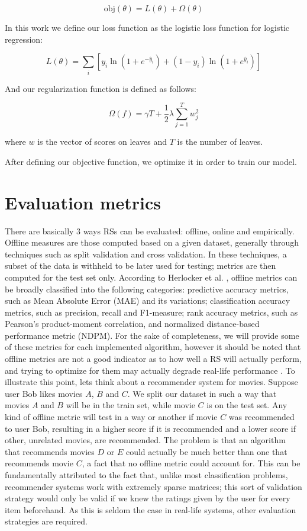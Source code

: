 \documentclass[cic,tc,english]{iiufrgs}
\begin{document}
$$\text{obj}(\theta) = L(\theta) + \Omega(\theta)$$

In this work we define our loss function as the logistic loss function for logistic regression:

$$L(\theta) = \sum_i[ y_i\ln (1+e^{-\hat{y}_i}) + (1-y_i)\ln (1+e^{\hat{y}_i})]$$

And our regularization function is defined as follows:

$$\Omega(f) = \gamma T + \frac{1}{2}\lambda \sum_{j=1}^T w_j^2$$

where \(w\) is the vector of scores on leaves and \(T\) is the number of leaves.

After defining our objective function, we optimize it in order to train our model.

\section{Evaluation metrics}
There are basically 3 ways RSs can be evaluated: offline, online and empirically. Offline measures are those computed based on a given dataset, generally through techniques such as split validation and cross validation. In these techniques, a subset of the data is withheld to be later used for testing; metrics are then computed for the test set only. According to Herlocker et al. \cite{Herlocker2004}, offline metrics can be broadly classified into the following categories: predictive accuracy metrics, such as Mean Absolute Error (MAE) and its variations; classification accuracy metrics, such as precision, recall and F1-measure; rank accuracy metrics, such as Pearson’s product-moment correlation, and normalized distance-based performance metric (NDPM). For the sake of completeness, we will provide some of these metrics for each implemented algorithm, however it should be noted that offline metrics are not a good indicator as to how well a RS will actually perform, and trying to optimize for them may actually degrade real-life performance \cite{McNee2006}. To illustrate this point, lets think about a recommender system for movies. Suppose user Bob likes movies $A$, $B$ and $C$. We split our dataset in such a way that movies $A$ and $B$ will be in the train set, while movie $C$ is on the test set. Any kind of offline metric will test in a way or another if movie $C$ was recommended to user Bob, resulting in a higher score if it is recommended and a lower score if other, unrelated movies, are recommended. The problem is that an algorithm that recommends movies $D$ or $E$ could actually be much better than one that recommends movie $C$, a fact that no offline metric could account for. This can be fundamentally attributed to the fact that, unlike most classification problems, recommender systems work with extremely sparse matrices; this sort of validation strategy would only be valid if we knew the ratings given by the user for every item beforehand. As this is seldom the case in real-life systems, other evaluation strategies are required.
\end{document}

